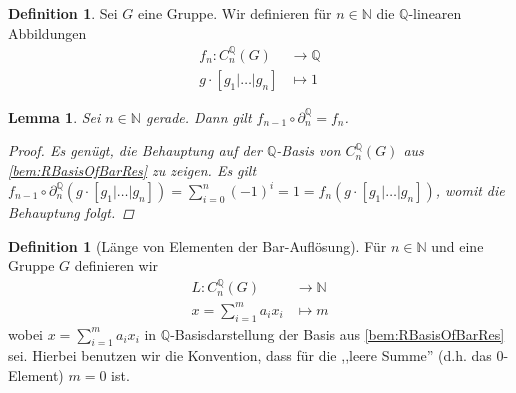 \documentclass[a4paper,twoside,10pt]{scrreprt}
\newcommand{\N}{\mathbb{N}}
\newcommand{\Q}{\mathbb{Q}}
\newtheorem{lemma}[satz]{Lemma}
\theoremstyle{definition}
\newtheorem{definition}[satz]{Definition}
\begin{document}
\begin{definition}
Sei $G$ eine Gruppe. Wir definieren für $n\in\N$ die $\Q$-linearen Abbildungen
\begin{align*}
f_n:C_n^{\Q}(G)&\to \Q\\
g\cdot[g_1|\ldots|g_n]&\mapsto 1
\end{align*}
\end{definition}

\begin{lemma}\label{lem:MapsCommute}
Sei $n\in\N$ gerade. Dann gilt $f_{n-1}\circ\partial_n^{\Q}=f_n$.
\begin{proof}
Es genügt, die Behauptung auf der $\Q$-Basis von $C_n^{\Q}(G)$ aus \cref{bem:RBasisOfBarRes} zu zeigen. Es gilt $f_{n-1}\circ\partial_n^{\Q}(g\cdot[g_1|\ldots|g_n])=\sum\limits_{i=0}^n(-1)^i=1=f_n(g\cdot[g_1|\ldots|g_n])$, womit die Behauptung folgt.
\end{proof}
\end{lemma}

\begin{definition}[Länge von Elementen der Bar-Auflösung]
Für $n\in\N$ und eine Gruppe $G$ definieren wir
\begin{align*}
L:C_n^{\Q}(G)&\to \N\\
x=\sum\limits_{i=1}^ma_ix_i&\mapsto m
\end{align*}
wobei $x=\sum\limits_{i=1}^ma_ix_i$ in $\Q$-Basisdarstellung der Basis aus \cref{bem:RBasisOfBarRes} sei. Hierbei benutzen wir die Konvention, dass für die ,,leere Summe'' (d.h. das $0$-Element) $m=0$ ist.
\end{definition}
\end{document}
